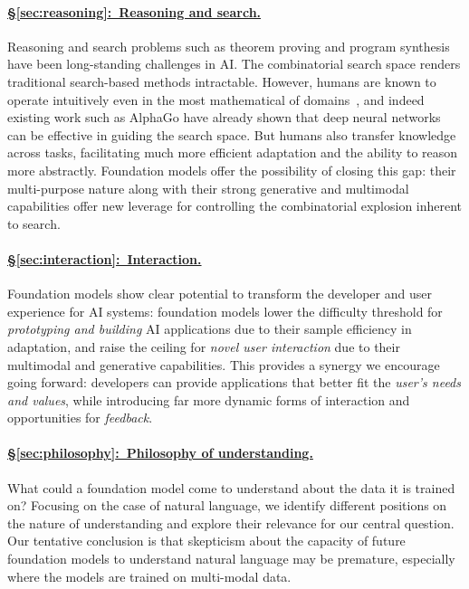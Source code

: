 \paragraph{\hyperref[sec:reasoning]{§\ref{sec:reasoning}:~Reasoning and search.}}

Reasoning and search problems such as theorem proving and program synthesis have been long-standing challenges in AI. The combinatorial search space renders traditional search-based methods intractable. However, humans are known to operate intuitively even in the most mathematical of domains~\citep{LakoffNunez00}, and indeed existing work such as AlphaGo have already shown that deep neural networks can be effective in guiding the search space. But humans also transfer knowledge across tasks, facilitating much more efficient adaptation and the ability to reason more abstractly.  Foundation models offer the possibility of closing this gap: their multi-purpose nature along with their strong generative and multimodal capabilities offer new leverage for controlling the combinatorial explosion inherent to search.

\paragraph{\hyperref[sec:interaction]{§\ref{sec:interaction}:~Interaction.}}
Foundation models show clear potential to transform the developer and user experience for AI systems: foundation models lower the difficulty threshold for \textit{prototyping and building} AI applications due to their sample efficiency in adaptation, and raise the ceiling for \textit{novel user interaction} due to their multimodal and generative capabilities. This provides a synergy we encourage going forward: developers can provide applications that better fit the \textit{user's needs and values}, while introducing far more dynamic forms of interaction and opportunities for \textit{feedback}.

\paragraph{\hyperref[sec:philosophy]{§\ref{sec:philosophy}:~Philosophy of understanding.}}

What could a foundation model come to understand about the data it is trained on? Focusing on the case of natural language, we identify different positions on the nature of understanding and explore their relevance for our central question. Our tentative conclusion is that skepticism about the capacity of future foundation models to understand natural language may be premature, especially where the models are trained on multi-modal data.

